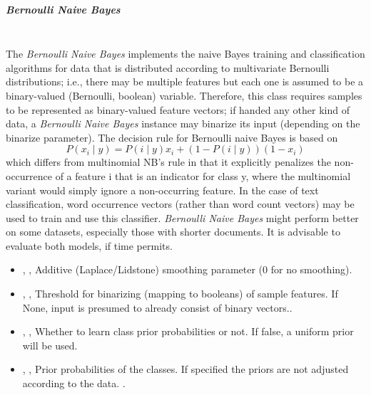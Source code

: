 \subparagraph{Bernoulli Naive Bayes}
\mbox{}
\\The \textit{Bernoulli Naive Bayes} implements the naive Bayes training and
classification algorithms for data that is distributed according to multivariate
Bernoulli distributions; i.e., there may be multiple features but each one is
assumed to be a binary-valued (Bernoulli, boolean) variable.
%
Therefore, this class requires samples to be represented as binary-valued
feature vectors; if handed any other kind of data, a \textit{Bernoulli Naive
  Bayes} instance may binarize its input (depending on the binarize parameter).
%
The decision rule for Bernoulli naive Bayes is based on
\begin{equation}
P(x_i \mid y) = P(i \mid y) x_i + (1 - P(i \mid y)) (1 - x_i)
\end{equation}
which differs from multinomial NB's rule in that it explicitly penalizes the
non-occurrence of a feature i that is an indicator for class y, where the
multinomial variant would simply ignore a non-occurring feature.
%
In the case of text classification, word occurrence vectors (rather than word
count vectors) may be used to train and use this classifier.
%
\textit{Bernoulli Naive Bayes} might perform better on some datasets, especially
those with shorter documents.
%
It is advisable to evaluate both models, if time permits.
%
\begin{itemize}
  \item {}, ,
  Additive (Laplace/Lidstone) smoothing parameter (0 for no smoothing).
  \item {}, ,
  Threshold for binarizing (mapping to booleans) of sample features.
  If None, input is presumed to already consist of binary vectors..
  \item {}, ,
  Whether to learn class prior probabilities or not.
  If false, a uniform prior will be used.
  \item {}, ,
  Prior probabilities of the classes.
  If specified the priors are not adjusted according to the data.
  .
\end{itemize}
